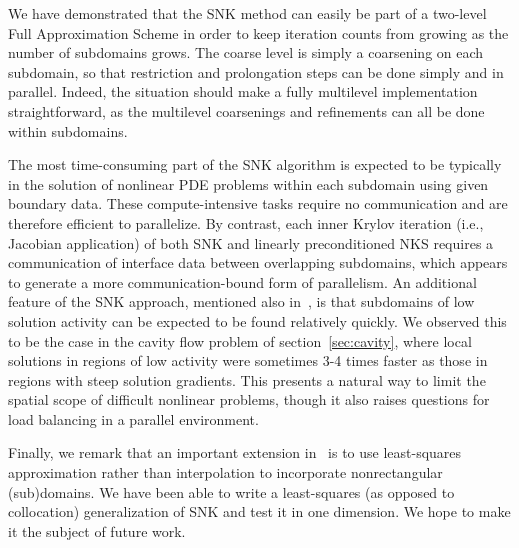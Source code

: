 We have demonstrated that the SNK method can easily be part of a two-level Full Approximation Scheme in order to keep iteration counts from growing as the number of subdomains grows. The coarse level is simply a coarsening on each subdomain, so that restriction and prolongation steps can be done simply and in parallel. Indeed, the situation should make a fully multilevel implementation straightforward, as the multilevel coarsenings and refinements can all be done within subdomains.

The most time-consuming part of the SNK algorithm is expected to be typically in the solution of nonlinear PDE problems within each subdomain using given boundary data. These compute-intensive tasks require no communication and are therefore efficient to parallelize. By contrast, each inner Krylov iteration (i.e., Jacobian application) of both SNK and linearly preconditioned NKS requires a communication of interface data between overlapping subdomains, which appears to generate a more communication-bound form of parallelism. An additional feature of the SNK approach, mentioned also in~\cite{Cai2002}, is that subdomains of low solution activity can be expected to be found relatively quickly. We observed this to be the case in the cavity flow problem of section~\ref{sec:cavity}, where local solutions in regions of low activity were sometimes 3-4 times faster as those in regions with steep solution gradients. This presents a natural way to limit the spatial scope of difficult nonlinear problems, though it also raises questions for load balancing in a parallel environment.

Finally, we remark that an important extension in~\cite{AitonTA} is to use least-squares approximation rather than interpolation to incorporate nonrectangular (sub)domains. We have been able to write a least-squares (as opposed to collocation) generalization of SNK and test it in one dimension. We hope to make it the subject of future work.